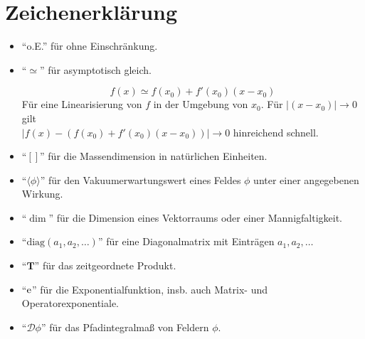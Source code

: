 \clearpage
\section*{Zeichenerklärung}

\begin{itemize}
\item "`o.E."' für ohne Einschränkung.

\item "`$\simeq$"' für asymptotisch gleich.
	\begin{beispiel}
	 \begin{equation}
	  f(x)\simeq f(x_0)+f'(x_0)(x-x_0)
	 \end{equation}
	  Für eine Linearisierung von $f$ in der Umgebung von $x_0$. Für 
	  $
	  \left|(x-x_0)\right|\rightarrow 0
	  $
	  gilt \\ 
	  $
	  \left|f(x)-\left(f(x_0)+f'(x_0)(x-x_0)\right)\right|\rightarrow 0 
	  $
	  hinreichend schnell.
	\end{beispiel}

  \item "`$[]$"' für die Massendimension in natürlichen Einheiten.
  
  \item "`$\Big\langle \phi \Big\rangle$"' für den Vakuumerwartungswert eines Feldes $\phi$ 
	  unter einer angegebenen Wirkung.
  
  \item "`$\dim$"' für die Dimension eines Vektorraums oder einer Mannigfaltigkeit.

	
  \item "`$\text{diag}(a_1,a_2,\ldots)$"' für eine Diagonalmatrix mit Einträgen $a_1,a_2,\ldots$


  \item "`$\textbf{T}$"' für das zeitgeordnete Produkt.
  
  \item "`$\text{e}$"' für die Exponentialfunktion, insb. auch Matrix- und Operatorexponentiale.
  
  \item "`$\mathcal{D}\phi$"' für das Pfadintegralmaß von Feldern $\phi$.
      
 
 
\end{itemize}
